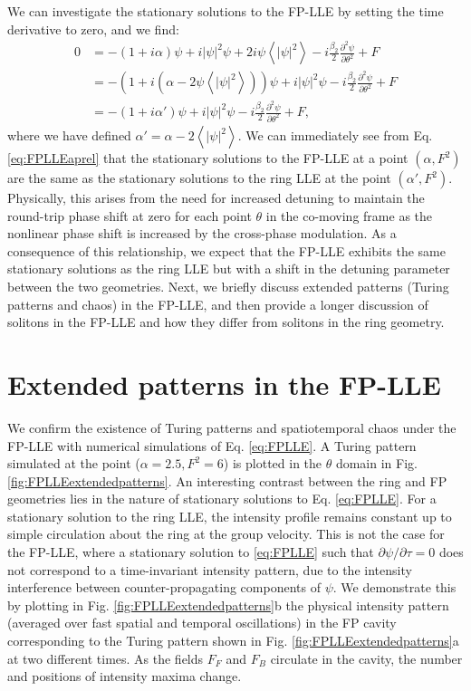 We can investigate the stationary solutions to the FP-LLE by setting the time derivative to zero, and we find:
\begin{align}
0&=-(1+i\alpha)\psi+i|\psi|^2\psi+2i\psi\left<|\psi|^2\right>-i\frac{\beta_2}{2}\frac{\partial^2\psi}{\partial\theta^2}+F\\
&=-\left(1+i(\alpha-2\psi\left<|\psi|^2\right>)\right)\psi+i|\psi|^2\psi-i\frac{\beta_2}{2}\frac{\partial^2\psi}{\partial\theta^2}+F\\
&=-(1+i\alpha')\psi+i|\psi|^2\psi-i\frac{\beta_2}{2}\frac{\partial^2\psi}{\partial\theta^2}+F,\label{eq:FPLLEaprel}
\end{align}
where we have defined $\alpha'=\alpha-2\left<|\psi|^2\right>$. We can immediately see from Eq. \ref{eq:FPLLEaprel} that the stationary solutions to the FP-LLE at a point $(\alpha,F^2)$ are the same as the stationary solutions to the ring LLE at the point $(\alpha',F^2)$. Physically, this arises from the need for increased detuning to maintain the round-trip phase shift at zero for each point $\theta$ in the co-moving frame as the nonlinear phase shift is increased by the cross-phase modulation. As a consequence of this relationship, we expect that the FP-LLE exhibits the same stationary solutions as the ring LLE but with a shift in the detuning parameter between the two geometries. Next, we briefly discuss extended patterns (Turing patterns and chaos) in the FP-LLE, and then provide a longer discussion of solitons in the FP-LLE and how they differ from solitons in the ring geometry.

\section{Extended patterns in the FP-LLE}

We confirm the existence of Turing patterns and spatiotemporal chaos under the FP-LLE with numerical simulations of Eq. \ref{eq:FPLLE}. A Turing pattern simulated at the point ($\alpha=2.5,F^2=6$) is plotted in the $\theta$ domain in Fig. \ref{fig:FPLLEextendedpatterns}. An interesting contrast between the ring and FP geometries lies in the nature of stationary solutions to Eq. \ref{eq:FPLLE}. For a stationary solution to the ring LLE, the intensity profile remains constant up to simple circulation about the ring at the group velocity. This is not the case for the FP-LLE, where a stationary solution to \ref{eq:FPLLE} such that $\partial\psi/\partial\tau=0$ does not correspond to a time-invariant intensity pattern, due to the intensity interference between counter-propagating components of $\psi$. We demonstrate this by plotting in Fig. \ref{fig:FPLLEextendedpatterns}b the physical intensity pattern (averaged over fast spatial and temporal oscillations) in the FP cavity corresponding to the Turing pattern shown in Fig. \ref{fig:FPLLEextendedpatterns}a at two different times. As the fields $F_F$ and $F_B$ circulate in the cavity, the number and positions of intensity maxima change. 

